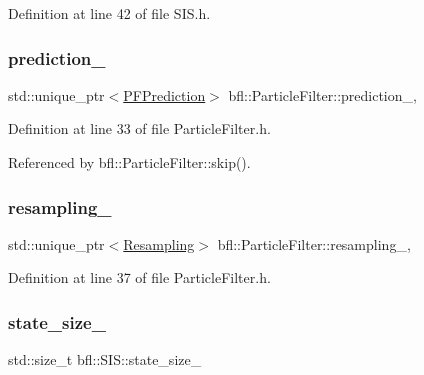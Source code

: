 Definition at line 42 of file S\+I\+S.\+h.

\mbox{\label{classbfl_1_1ParticleFilter_ab86f707d29a823423fe35de37e8f9d8e}} 
\subsubsection{\texorpdfstring{prediction\+\_\+}{prediction\_}}
{\footnotesize\ttfamily std\+::unique\+\_\+ptr$<$\mbox{\hyperlink{classbfl_1_1PFPrediction}{P\+F\+Prediction}}$>$ bfl\+::\+Particle\+Filter\+::prediction\+\_\+\hspace{0.3cm}{\ttfamily [protected]}, {\ttfamily [inherited]}}



Definition at line 33 of file Particle\+Filter.\+h.



Referenced by bfl\+::\+Particle\+Filter\+::skip().

\mbox{\label{classbfl_1_1ParticleFilter_a9b0b855942fa4fb847443b10fe26c589}} 
\subsubsection{\texorpdfstring{resampling\+\_\+}{resampling\_}}
{\footnotesize\ttfamily std\+::unique\+\_\+ptr$<$\mbox{\hyperlink{classbfl_1_1Resampling}{Resampling}}$>$ bfl\+::\+Particle\+Filter\+::resampling\+\_\+\hspace{0.3cm}{\ttfamily [protected]}, {\ttfamily [inherited]}}



Definition at line 37 of file Particle\+Filter.\+h.

\mbox{\label{classbfl_1_1SIS_a4b4789fd511416051baea5d78f882cff}} 
\subsubsection{\texorpdfstring{state\+\_\+size\+\_\+}{state\_size\_}}
{\footnotesize\ttfamily std\+::size\+\_\+t bfl\+::\+S\+I\+S\+::state\+\_\+size\+\_\+\hspace{0.3cm}{\ttfamily [protected]}}



